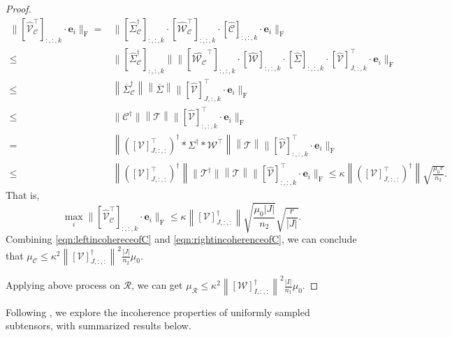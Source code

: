 \documentclass[twoside,12pt]{article}
\def\fro{{\mathrm{F}}}
\def\fro{{\mathrm{F}}}
\begin{document}
\begin{proof}
\begin{align*}
\|[\widehat{\mathcal{V}}_{\mathcal{C}}^\top]_{:,:,k}\cdot \mathbf{e}_i\|_{\fro}=&\|[\widehat{\Sigma}_{\mathcal{C}}^{\dagger}]_{:,:,k} \cdot [\widehat{\mathcal{W}}_{\mathcal{C}}^{\top}]_{:,:,k}\cdot [\widehat{\mathcal{C}}]_{:,:,k}\cdot \mathbf{e}_i\|_{\fro}\\
\leq &\|[\widehat{\Sigma}_{\mathcal{C}}^{\dagger}]_{:,:,k}\|\|[\widehat{\mathcal{W}_{\mathcal{C}}}^\top]_{:,:,k}\cdot[\widehat{\mathcal{W}}]_{:,:,k}\cdot[\widehat{\Sigma}]_{:,:,k}\cdot [\widehat{\mathcal{V}}]_{J,:,k}^{\top}\cdot \mathbf{e}_i\|_{\fro}\\
\leq& \left\|\overline{\Sigma}_{\mathcal{C}}^{\dagger}\right\|\left\|\overline{\Sigma}\right\|\|[\widehat{\mathcal{V}}]_{J,:,k}^{\top}\cdot \mathbf{e}_i\|_{\fro}\\
\leq&  \|\mathcal{C}^\dagger \|\left\|\mathcal{T}\right\|\|[\widehat{\mathcal{V}}]_{:,:,k}^{\top}\cdot \mathbf{e}_i\|_{\fro}\\
=& \left\|([\mathcal{V}]_{J,:,:}^{\top})^{\dagger}*{\Sigma}^{\dagger}*\mathcal{W}^{\top}\right\|\left\|\mathcal{T}\right\|\|[\widehat{\mathcal{V}}]_{:,:,k}^{\top}\cdot \mathbf{e}_i\|_{\fro}\\
 \leq& \left\|([\mathcal{V}]_{J,:,:}^{\top})^{\dagger}\right\|\|\mathcal{T}^{\dagger}\|\left\|\mathcal{T}\right\|\|[\widehat{\mathcal{V}}]_{:,:,k}^{\top}\cdot \mathbf{e}_i\|_{\fro}\leq \kappa \left\|([\mathcal{V}]_{J,:,:}^{\top})^{\dagger}\right\| \sqrt{\frac{\mu_0 r}{n_2}}.
\end{align*} 
That is, \begin{equation}\label{eqn:rightincoherenceofC}
    \max\limits_{i}\|[\widehat{\mathcal{V}}_{\mathcal{C}}^{\top}]_{:,:,k}\cdot \mathbf{e}_{i}\|_{\fro}\leq \kappa \left\|[\mathcal{V}]_{J,:,:}^{\dagger}\right\|\sqrt{\frac{\mu_0|J|}{n_2}} \sqrt{\frac{r}{|J|}}.
\end{equation} 
 Combining \eqref{eqn:leftincohereceofC} and \eqref{eqn:rightincoherenceofC}, we can conclude that $\mu_{\mathcal{C}}\leq \kappa^2 \left\|[\mathcal{V}]_{J,:,:}^{\dagger}\right\|^2\frac{|J|}{n_2}\mu_0$.
 
 Applying above process  on $\mathcal{R}$,  we can get  $\mu_{\mathcal{R}}\leq \kappa^2 \left\|[\mathcal{W}]_{I,:,:}^{\dagger}\right\|^2\frac{|I|}{n_1}\mu_0$. 
\end{proof}
Following , we explore the incoherence properties of uniformly sampled subtensors, with summarized results below.
 
\end{document}
